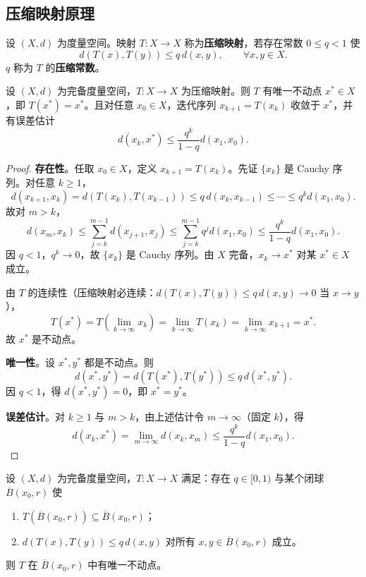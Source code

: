 \subsection{压缩映射原理}

\begin{definition}[压缩映射]\label{def:contraction_mapping}
设 $(X, d)$ 为度量空间。映射 $T: X \to X$ 称为\textbf{压缩映射}，若存在常数 $0 \le q < 1$ 使
\[
d(T(x), T(y)) \le q \, d(x, y), \qquad \forall x, y \in X.
\]
$q$ 称为 $T$ 的\textbf{压缩常数}。
\end{definition}

\begin{theorem}\label{thm:banach_fixed_point}
设 $(X, d)$ 为完备度量空间，$T: X \to X$ 为压缩映射。则 $T$ 有唯一不动点 $x^* \in X$，即 $T(x^*) = x^*$。且对任意 $x_0 \in X$，迭代序列 $x_{k+1} = T(x_k)$ 收敛于 $x^*$，并有误差估计
\[
d(x_k, x^*) \le \frac{q^k}{1 - q} d(x_1, x_0).
\]
\end{theorem}

\begin{proof}
\textbf{存在性}。任取 $x_0 \in X$，定义 $x_{k+1} = T(x_k)$。先证 $\{x_k\}$ 是 Cauchy 序列。对任意 $k \ge 1$，
\[
d(x_{k+1}, x_k) = d(T(x_k), T(x_{k-1})) \le q \, d(x_k, x_{k-1}) \le \cdots \le q^k d(x_1, x_0).
\]
故对 $m > k$，
\[
d(x_m, x_k) \le \sum_{j=k}^{m-1} d(x_{j+1}, x_j) \le \sum_{j=k}^{m-1} q^j d(x_1, x_0) \le \frac{q^k}{1 - q} d(x_1, x_0).
\]
因 $q < 1$，$q^k \to 0$，故 $\{x_k\}$ 是 Cauchy 序列。由 $X$ 完备，$x_k \to x^*$ 对某 $x^* \in X$ 成立。

由 $T$ 的连续性（压缩映射必连续：$d(T(x), T(y)) \le q \, d(x, y) \to 0$ 当 $x \to y$），
\[
T(x^*) = T\left( \lim_{k \to \infty} x_k \right) = \lim_{k \to \infty} T(x_k) = \lim_{k \to \infty} x_{k+1} = x^*.
\]
故 $x^*$ 是不动点。

\textbf{唯一性}。设 $x^*, y^*$ 都是不动点。则
\[
d(x^*, y^*) = d(T(x^*), T(y^*)) \le q \, d(x^*, y^*).
\]
因 $q < 1$，得 $d(x^*, y^*) = 0$，即 $x^* = y^*$。

\textbf{误差估计}。对 $k \ge 1$ 与 $m > k$，由上述估计令 $m \to \infty$（固定 $k$），得
\[
d(x_k, x^*) = \lim_{m \to \infty} d(x_k, x_m) \le \frac{q^k}{1 - q} d(x_1, x_0).
\]
\end{proof}

\begin{corollary}[压缩映射原理的局部形式]\label{cor:banach_local}
设 $(X, d)$ 为完备度量空间，$T: X \to X$ 满足：存在 $q \in [0, 1)$ 与某个闭球 $\overline{B}(x_0, r)$ 使
\begin{enumerate}[label=(\roman*)]
    \item $T(\overline{B}(x_0, r)) \subseteq \overline{B}(x_0, r)$；
    \item $d(T(x), T(y)) \le q \, d(x, y)$ 对所有 $x, y \in \overline{B}(x_0, r)$ 成立。
\end{enumerate}
则 $T$ 在 $\overline{B}(x_0, r)$ 中有唯一不动点。
\end{corollary}

